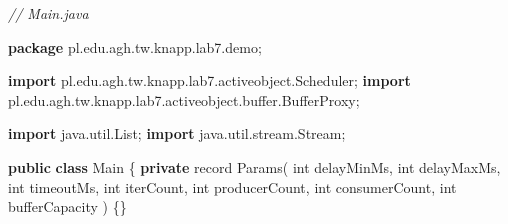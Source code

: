 \documentclass[11pt]{article}
\newenvironment{Shaded}{}{}
\newcommand{\KeywordTok}[1]{\textcolor[rgb]{0.00,0.44,0.13}{\textbf{{#1}}}}
\newcommand{\DataTypeTok}[1]{\textcolor[rgb]{0.56,0.13,0.00}{{#1}}}
\newcommand{\CommentTok}[1]{\textcolor[rgb]{0.38,0.63,0.69}{\textit{{#1}}}}
\newcommand{\FunctionTok}[1]{\textcolor[rgb]{0.02,0.16,0.49}{{#1}}}
\newcommand{\NormalTok}[1]{{#1}}
\newcommand{\ImportTok}[1]{{#1}}
\newcommand{\OperatorTok}[1]{\textcolor[rgb]{0.40,0.40,0.40}{{#1}}}
\begin{document}
\begin{Shaded}
\begin{Highlighting}[]
\CommentTok{// Main.java}

\KeywordTok{package}\ImportTok{ pl}\OperatorTok{.}\ImportTok{edu}\OperatorTok{.}\ImportTok{agh}\OperatorTok{.}\ImportTok{tw}\OperatorTok{.}\ImportTok{knapp}\OperatorTok{.}\ImportTok{lab7}\OperatorTok{.}\ImportTok{demo}\OperatorTok{;}

\KeywordTok{import} \ImportTok{pl}\OperatorTok{.}\ImportTok{edu}\OperatorTok{.}\ImportTok{agh}\OperatorTok{.}\ImportTok{tw}\OperatorTok{.}\ImportTok{knapp}\OperatorTok{.}\ImportTok{lab7}\OperatorTok{.}\ImportTok{activeobject}\OperatorTok{.}\ImportTok{Scheduler}\OperatorTok{;}
\KeywordTok{import} \ImportTok{pl}\OperatorTok{.}\ImportTok{edu}\OperatorTok{.}\ImportTok{agh}\OperatorTok{.}\ImportTok{tw}\OperatorTok{.}\ImportTok{knapp}\OperatorTok{.}\ImportTok{lab7}\OperatorTok{.}\ImportTok{activeobject}\OperatorTok{.}\ImportTok{buffer}\OperatorTok{.}\ImportTok{BufferProxy}\OperatorTok{;}

\KeywordTok{import} \ImportTok{java}\OperatorTok{.}\ImportTok{util}\OperatorTok{.}\ImportTok{List}\OperatorTok{;}
\KeywordTok{import} \ImportTok{java}\OperatorTok{.}\ImportTok{util}\OperatorTok{.}\ImportTok{stream}\OperatorTok{.}\ImportTok{Stream}\OperatorTok{;}

\KeywordTok{public} \KeywordTok{class}\NormalTok{ Main }\OperatorTok{\{}
    \KeywordTok{private}\NormalTok{ record }\FunctionTok{Params}\OperatorTok{(}
            \DataTypeTok{int}\NormalTok{ delayMinMs}\OperatorTok{,}
            \DataTypeTok{int}\NormalTok{ delayMaxMs}\OperatorTok{,}
            \DataTypeTok{int}\NormalTok{ timeoutMs}\OperatorTok{,}
            \DataTypeTok{int}\NormalTok{ iterCount}\OperatorTok{,}
            \DataTypeTok{int}\NormalTok{ producerCount}\OperatorTok{,}
            \DataTypeTok{int}\NormalTok{ consumerCount}\OperatorTok{,}
            \DataTypeTok{int}\NormalTok{ bufferCapacity}
    \OperatorTok{)} \OperatorTok{\{\}}


\end{Highlighting}
\end{Shaded}
\end{document}
